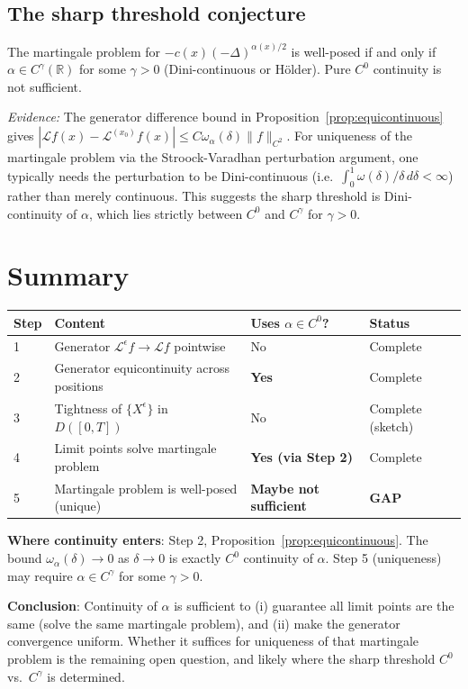 \documentclass{amsart}
\theoremstyle{definition}
\begin{document}
\subsection{The sharp threshold conjecture}

\begin{conjecture}
The martingale problem for $-c(x)(-\Delta)^{\alpha(x)/2}$ is well-posed if and only
if $\alpha \in C^\gamma(\mathbb{R})$ for some $\gamma > 0$ (Dini-continuous or Hölder).
Pure $C^0$ continuity is not sufficient.
\end{conjecture}

\emph{Evidence:} The generator difference bound in Proposition~\ref{prop:equicontinuous}
gives $|\mathcal{L}f(x) - \mathcal{L}^{(x_0)}f(x)| \leq C \omega_\alpha(\delta)\|f\|_{C^2}$.
For uniqueness of the martingale problem via the Stroock-Varadhan perturbation argument,
one typically needs the perturbation to be Dini-continuous (i.e.\ $\int_0^1 \omega(\delta)/\delta\,d\delta < \infty$)
rather than merely continuous. This suggests the sharp threshold is Dini-continuity of $\alpha$,
which lies strictly between $C^0$ and $C^\gamma$ for $\gamma > 0$.

\section{Summary}

\begin{center}
\renewcommand{\arraystretch}{1.3}
\begin{tabular}{llll}
\hline
Step & Content & Uses $\alpha \in C^0$? & Status \\
\hline
1 & Generator $\mathcal{L}^\epsilon f \to \mathcal{L} f$ pointwise & No & Complete \\
2 & Generator equicontinuity across positions & \textbf{Yes} & Complete \\
3 & Tightness of $\{X^\epsilon\}$ in $D([0,T])$ & No & Complete (sketch) \\
4 & Limit points solve martingale problem & \textbf{Yes (via Step 2)} & Complete \\
5 & Martingale problem is well-posed (unique) & \textbf{Maybe not sufficient} & \textbf{GAP} \\
\hline
\end{tabular}
\end{center}

\medskip
\textbf{Where continuity enters}: Step 2, Proposition~\ref{prop:equicontinuous}.
The bound $\omega_\alpha(\delta) \to 0$ as $\delta \to 0$ is exactly $C^0$ continuity
of $\alpha$. Step 5 (uniqueness) may require $\alpha \in C^\gamma$ for some $\gamma > 0$.

\medskip
\textbf{Conclusion}: Continuity of $\alpha$ is sufficient to (i) guarantee all limit
points are the same (solve the same martingale problem), and (ii) make the generator
convergence uniform. Whether it suffices for uniqueness of that martingale problem is
the remaining open question, and likely where the sharp threshold $C^0$ vs.\ $C^\gamma$
is determined.
\end{document}
